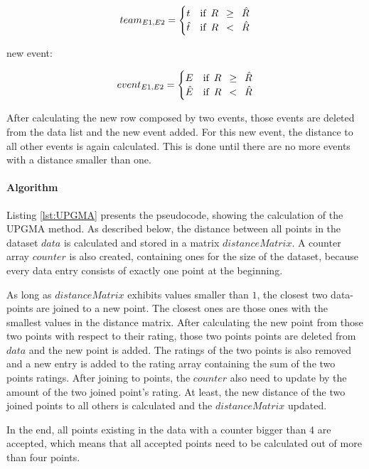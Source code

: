 $$
team_{E1,E2} =
		\begin{cases}
			t	& \text{if} \enskip R  \enskip \ge \enskip \hat{R} \\
			\hat{t}	& \text{if} \enskip R \enskip < \enskip \hat{R} \\
		\end{cases}
$$

new event:

$$
event_{E1,E2} =
		\begin{cases}
			E	& \text{if} \enskip R \enskip \ge \enskip \hat{R} \\
			\hat{E}	& \text{if} \enskip R \enskip < \enskip \hat{R} \\
		\end{cases}
$$

After calculating the new row composed by two events, those events are deleted from the data list and the new event added.
For this new event, the distance to all other events is again calculated.
This is done until there are no more events with a distance smaller than one.

\paragraph{Algorithm}

Listing \ref{lst:UPGMA} presents the pseudocode, showing the calculation of the UPGMA method.
As described below, the distance between all points in the dataset $data$ is calculated and stored in a matrix $distanceMatrix$. A counter array $counter$ is also created, containing ones for the size of the dataset, because every data entry consists of exactly one point at the beginning.


As long as $distanceMatrix$ exhibits values smaller than $1$, the closest two data-points are joined to a new point. The closest ones are those ones with the smallest values in the distance matrix. After calculating the new point from those two points with respect to their rating, those two points points are deleted from $data$ and the new point is added. The ratings of the two points is also removed and a new entry is added to the rating array containing the sum of the two points ratings. 
After joining to points, the $counter$ also need to update by the amount of the two joined point's rating.
At least, the new distance of the two joined points to all others is calculated and the $distanceMatrix$ updated.

In the end, all points existing in the data with a counter bigger than 4 are accepted, which means that all accepted points need to be calculated out of more than four points.

